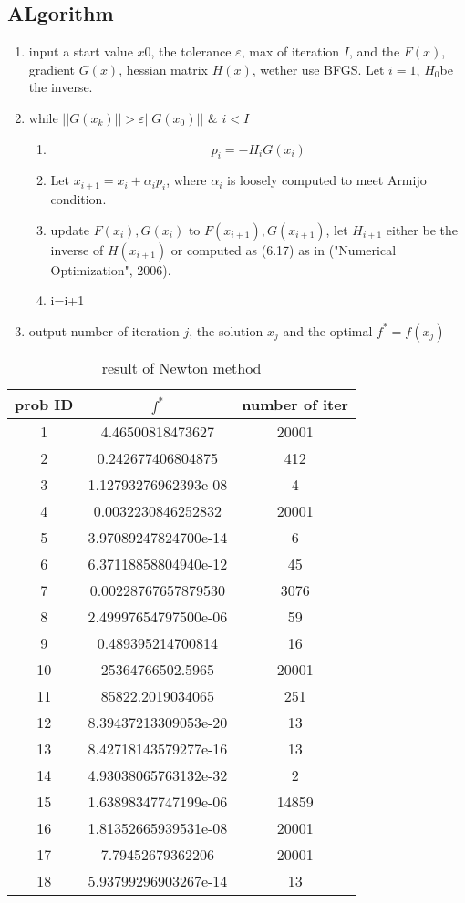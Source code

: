 \documentclass[12pt,a4paper]{article}
\begin{document}
\subsection{ALgorithm}
\begin{enumerate}
	\item input a start value $x0$, the tolerance $\varepsilon$, max of iteration $I$, and the $F(x)$, gradient $G(x)$, hessian matrix $H(x)$, wether use BFGS. Let $i=1$, $H_0$be the inverse.
	
	\item while $||G(x_k)||>\varepsilon||G(x_0)||$ \& $i<I$
	\begin{enumerate}
		\item 
		\[p_i=-H_iG(x_i)\]
		\item Let $x_{i+1}=x_i+\alpha_ip_i$, where $\alpha_i$ is loosely computed to meet Armijo condition.
		\item update $F(x_i),G(x_i)$ to $F(x_{i+1}),G(x_{i+1})$, let $H_{i+1}$ either be the inverse of $H(x_{i+1})$ or computed as (6.17) as in ("Numerical Optimization", 2006).
		\item i=i+1
	\end{enumerate}
	\item output number of iteration $j$, the solution $x_j$ and the optimal $f^*=f(x_j)$
\end{enumerate}
\begin{table}
	\begin{tabular}{|c|c|c|} \hline
prob ID & $f^*$ & number of iter\\		\hline
1& 4.46500818473627	&20001\\
2& 0.242677406804875&	412\\
3 & 1.12793276962393e-08	&4\\
4& 0.0032230846252832&	20001\\
5 &3.97089247824700e-14&	6\\
6 &6.37118858804940e-12&	45\\
7 &0.00228767657879530	&3076\\
8 &2.49997654797500e-06	&59\\
9 &0.489395214700814	&16\\
10& 25364766502.5965	&20001\\
11 &85822.2019034065	&251\\
12 &8.39437213309053e-20&	13\\
13 &8.42718143579277e-16&	13\\
14 &4.93038065763132e-32&	2\\
15 &1.63898347747199e-06&	14859\\
16 &1.81352665939531e-08&	20001\\
17 &7.79452679362206	&20001\\
18 &5.93799296903267e-14&	13	\\	\hline
	\end{tabular}
	\caption{result of Newton method}
\end{table}
\end{document}
